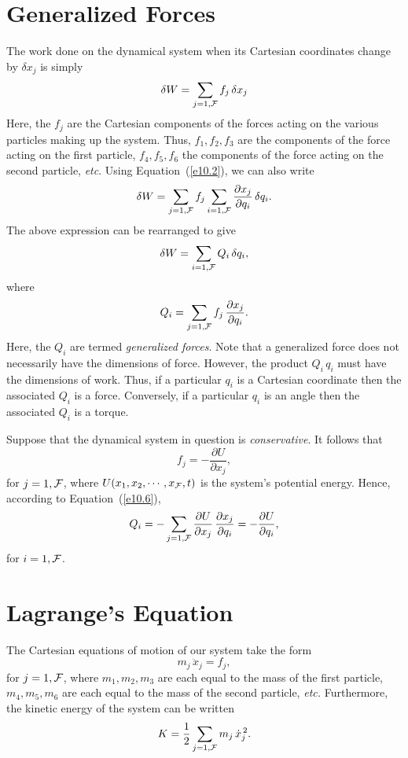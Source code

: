 \section{Generalized Forces}
The work done on the dynamical system when its Cartesian coordinates
change by $\delta x_j$ is simply
\begin{equation}
\delta W = \sum_{j=1,{\cal F}} f_j\,\delta x_j
\end{equation}
Here, the $f_j$ are the Cartesian components of the forces acting on the
various particles making up the system. Thus, $f_1, f_2, f_3$ are the
components of the force acting on the first particle, $f_4, f_5, f_6$ 
the components of the force acting on the second particle, {\em etc}. 
Using Equation~(\ref{e10.2}), we can also write
\begin{equation}
\delta W = \sum_{j=1,{\cal F}} f_j\sum_{i=1,{\cal F}}\frac{\partial x_j}{\partial q_i}\,\delta q_i.
\end{equation}
The above expression can be rearranged to give
\begin{equation}
\delta W = \sum_{i=1,{\cal F}} Q_i\,\delta q_i,
\end{equation}
where 
\begin{equation}\label{e10.6}
Q_i = \sum_{j=1,{\cal F}} f_j\,\frac{\partial x_j}{\partial q_i}.
\end{equation}
Here, the $Q_i$ are termed {\em generalized forces}. Note that a generalized
force does not necessarily have the dimensions of force. However, the
product $Q_i\,q_i$ must have the dimensions of work. Thus, if 
a particular $q_i$ is a Cartesian coordinate then the associated $Q_i$ is a force.
Conversely, if a particular $q_i$ is an angle then the associated $Q_i$ is a torque. 

Suppose that the dynamical system in question is {\em conservative}. It follows that
\begin{equation}
f_j = -\frac{\partial U}{\partial x_j},
\end{equation}
for $j=1,{\cal F}$, where $U(x_1,x_2,\cdots,x_{\cal F},t)$ is the system's potential energy. Hence, according to Equation~(\ref{e10.6}), 
\begin{equation}\label{e10.8}
Q_i = - \sum_{j=1,{\cal F}} \frac{\partial U}{\partial x_j}\,\frac{\partial x_j}{\partial q_i} = - \frac{\partial U}{\partial q_i},
\end{equation}
for $i=1,{\cal F}$. 

\section{Lagrange's Equation}
The Cartesian equations of motion of our system take
the form
\begin{equation}\label{e10.10}
m_j\,\ddot{x}_j = f_j,
\end{equation}
for $j=1,{\cal F}$, where $m_1, m_2, m_3$ are each equal to the mass of the
first particle, $m_4, m_5, m_6$ are each equal to the mass of the
second particle, {\em etc.} Furthermore, the kinetic energy of the
system can be written
\begin{equation}\label{e10.11}
K = \frac{1}{2}\sum_{j=1,{\cal F}} m_j\,\dot{x}_j^{\,2}.
\end{equation}

